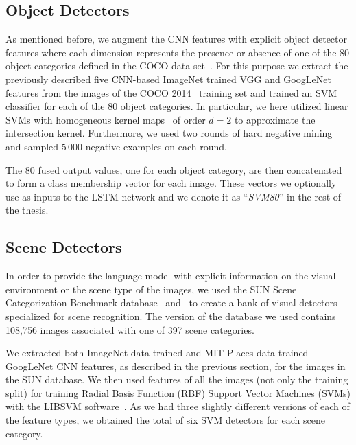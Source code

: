 \subsection{Object Detectors}
\label{subsec:svm80}

As mentioned before,  we augment the CNN features with explicit object detector
features where each dimension represents the presence or absence of one of the
80 object categories defined in the COCO data set~\cite{Lin2014}.
For this purpose we extract the previously described five CNN-based ImageNet
trained VGG and GoogLeNet features from the images of the COCO
2014~\cite{Lin2014} training set and trained an SVM classifier for each of the
80 object categories.
In particular, we here utilized linear SVMs with homogeneous kernel
maps~\cite{Vedaldi2010} of order $d=2$ to approximate the intersection kernel.
Furthermore, we used two rounds of hard negative mining~\cite{Li2013} and
sampled $5\,000$ negative examples on each round.

The 80 fused output values, one for each object category, are then concatenated
to form a class membership vector for each image.
These vectors we optionally use as inputs to the LSTM network and we denote it
as ``\emph{SVM80}'' in the rest of the thesis.

\subsection{Scene Detectors}

In order to provide the language model with explicit information on the visual
environment or the scene type of the images, we used the SUN Scene
Categorization Benchmark database~\cite{Xiao2010} and~\cite{Xiao2014} to create
a bank of visual detectors specialized for scene recognition.
The version of the database we used contains 108,756 images associated with one
of 397 scene categories.

We extracted both ImageNet data trained and MIT Places data trained GoogLeNet
CNN features, as described in the previous section, for the images in the SUN
database.
We then used features of all the images (not only the training split) for
training Radial Basis Function (RBF) Support Vector Machines (SVMs) with the
LIBSVM software~\cite{LIBSVM}.
As we had three slightly different versions of each of the feature types, we
obtained the total of six SVM detectors for each scene category.

